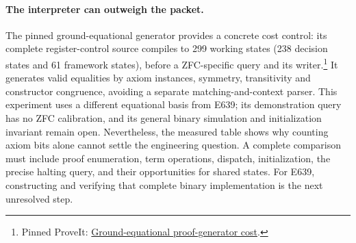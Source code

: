 \paragraph{The interpreter can outweigh the packet.}
The pinned ground-equational generator provides a concrete cost control:
its complete register-control source compiles to 299 working states
(238 decision states and 61 framework states), before a ZFC-specific query
and its writer.\footnote{Pinned ProveIt:
\href{https://github.com/VladimirReshetnikov/ProveIt/blob/1b27f052d770f4c7d435e82e779bf21f5a1f66ed/Computability/BusyBeaver/Research/ZFC/equational_generator_cost.md}{Ground-equational proof-generator cost}.}
It generates valid equalities by axiom instances, symmetry, transitivity
and constructor congruence, avoiding a separate matching-and-context
parser.  This experiment uses a different equational basis from E639;
its demonstration query has no ZFC calibration, and its general binary
simulation and initialization invariant remain open.  Nevertheless, the
measured table shows why counting axiom bits alone cannot settle the
engineering question.  A complete comparison must include proof
enumeration, term operations, dispatch, initialization, the precise
halting query, and their opportunities for shared states.  For E639,
constructing and verifying that complete binary implementation is the
next unresolved step.
